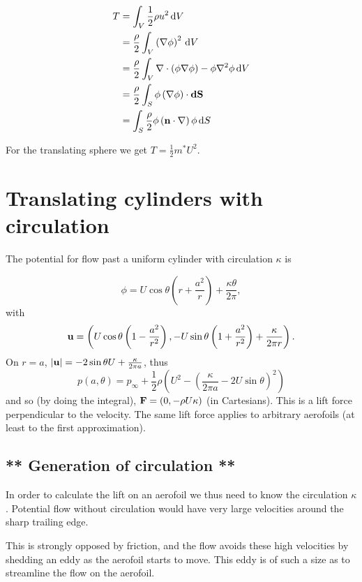 \documentclass{notes}
\newcommand{\grad}{\nabla}
\newcommand{\divr}{\nabla\cdot}
\newcommand{\lapl}{\nabla^2}
\newcommand{\dgrad}[2]{\left(#1\cdot\nabla\right)#2}
\begin{document}
\begin{align*}
  T &= \int_V \frac{1}{2} \rho u^2 \,\ud V \\
  &= \frac{\rho}{2} \int_V \left( \grad{\phi} \right)^2 \,\ud V \\
  &= \frac{\rho}{2} \int_V \divr{\left(\phi \grad{\phi}\right)}
  - \phi \lapl\phi \,\ud V \\
  &= \frac{\rho}{2} \int_S \phi \left(\grad{\phi}\right)\cdot\vect{dS} \\
  &= \int_S \frac{\rho}{2} \phi \dgrad{\vn}{\phi}\, \ud S
\end{align*}

For the translating sphere we get $T = \frac{1}{2} m^* U^2$.

\section{Translating cylinders with circulation}

The potential for flow past a uniform cylinder with circulation
$\kappa$ is

\[
\phi = U \cos \theta \left( r + \frac{a^2}{r} \right) + \frac{\kappa
  \theta}{2 \pi},
\]
with
\[
\mathbf{u} = \left( U \cos \theta \left( 1 - \frac{a^2}{r^2} \right), -U \sin
  \theta \left( 1 + \frac{a^2}{r^2} \right) + \frac{\kappa}{2 \pi r}
\right).
\]
On $r=a$, $\left|\mathbf{u}\right| = -2 \sin \theta U + \frac{\kappa}{2 \pi a}$, thus
\[
p(a,\theta) = p_\infty + \frac{1}{2} \rho \left( U^2 - \left(
    \frac{\kappa}{2 \pi a} - 2 U \sin \theta \right)^2 \right)
\]
and so (by doing the integral), $\mathbf{F} = \left( 0,-\rho U \kappa \right)$
(in Cartesians). This is a lift force perpendicular to the velocity.
The same lift
force applies to arbitrary aerofoils (at least to the first
approximation).

\subsection[Generation of circulation]{** Generation of circulation
  **}

In order to calculate the lift on an aerofoil we thus need to know the
circulation $\kappa$.  Potential flow without circulation would have
very large velocities around the sharp trailing edge.

\vspace{1.5in}

This is strongly opposed by friction, and the flow avoids these high
velocities by shedding an eddy as the aerofoil starts to move.  This
eddy is of such a size as to streamline the flow on the aerofoil.
\end{document}
